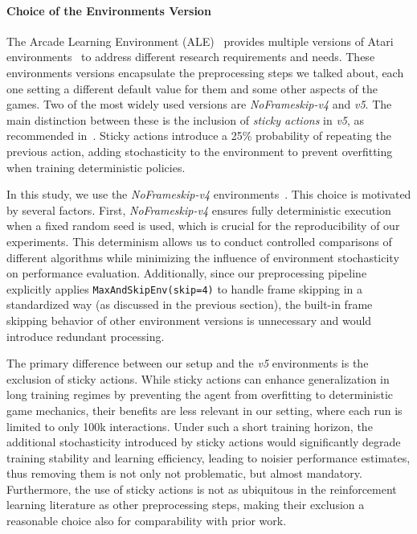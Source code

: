 \paragraph{Choice of the Environments Version}
The Arcade Learning Environment (ALE)~\cite{bellemare:ale} provides multiple versions of Atari environments~\cite{farama:ale} to address different research requirements and needs. These environments versions encapsulate the preprocessing steps we talked about, each one setting a different default value for them and some other aspects of the games. Two of the most widely used versions are \textit{NoFrameskip-v4} and \textit{v5}. The main distinction between these is the inclusion of \textit{sticky actions} in \textit{v5}, as recommended in~\cite{machado:revisiting_ale}. Sticky actions introduce a 25\% probability of repeating the previous action, adding stochasticity to the environment to prevent overfitting when training deterministic policies. 

In this study, we use the \textit{NoFrameskip-v4} environments~\cite{farama:ale}. This choice is motivated by several factors. First, \textit{NoFrameskip-v4} ensures fully deterministic execution when a fixed random seed is used, which is crucial for the reproducibility of our experiments. This determinism allows us to conduct controlled comparisons of different algorithms while minimizing the influence of environment stochasticity on performance evaluation. Additionally, since our preprocessing pipeline explicitly applies \verb|MaxAndSkipEnv(skip=4)| to handle frame skipping in a standardized way (as discussed in the previous section), the built-in frame skipping behavior of other environment versions is unnecessary and would introduce redundant processing.

The primary difference between our setup and the \textit{v5} environments is the exclusion of sticky actions. While sticky actions can enhance generalization in long training regimes by preventing the agent from overfitting to deterministic game mechanics, their benefits are less relevant in our setting, where each run is limited to only 100k interactions. Under such a short training horizon, the additional stochasticity introduced by sticky actions would significantly degrade training stability and learning efficiency, leading to noisier performance estimates, thus removing them is not only not problematic, but almost mandatory. Furthermore, the use of sticky actions is not as ubiquitous in the reinforcement learning literature as other preprocessing steps, making their exclusion a reasonable choice also for comparability with prior work.

